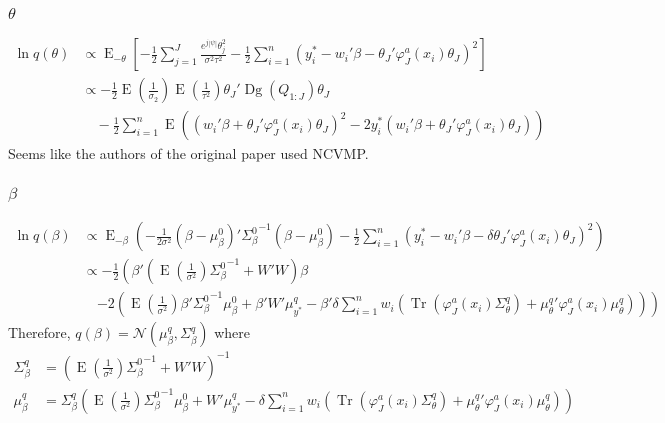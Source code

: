 \documentclass[11pt]{article}
\DeclareMathOperator{\Tr}{Tr}
\newcommand{\opn}{\operatorname}
\begin{document}
\subsubsection{$\theta$}
  \begin{align*}
    \ln q\left(\theta\right) &\propto \opn{E}_{-\theta}\left[-\frac{1}{2}\sum_{j=1}^{J}\frac{e^{j\left|\psi\right|}\theta_{j}^{2}}{\sigma^{2}\tau^{2}} -\frac{1}{2}\sum_{i=1}^{n}\left(y_{i}^{*}-w_{i}'\beta -\theta_{J}'\varphi_{J}^{a}\left(x_{i}\right)\theta_{J}\right)^{2} \right]\\
    &\propto -\frac{1}{2}\opn{E}\left(\frac{1}{\sigma_{2}}\right)\opn{E}\left(\frac{1}{\tau^{2}}\right)\theta_{J}'\opn{Dg}\left(Q_{1:J}\right)\theta_{J}\\
    &\quad  -\frac{1}{2}\sum_{i=1}^{n}\opn{E}\left(\left(w_{i}'\beta + \theta_{J}'\varphi_{J}^{a}\left(x_{i}\right)\theta_{J} \right)^{2} -2y_{i}^{*}\left(w_{i}'\beta + \theta_{J}'\varphi_{J}^{a}\left(x_{i}\right)\theta_{J}\right) \right)
  \end{align*}
Seems like the authors of the original paper used NCVMP.
\subsubsection{$\beta$}
  \begin{align*}
    \ln q\left(\beta\right)&\propto \opn{E}_{-\beta}\left(-\frac{1}{2\sigma^{2}}\left(\beta-\mu_{\beta}^{0}\right)'{\Sigma_{\beta}^{0}}^{-1}\left(\beta-\mu_{\beta}^{0}\right)-\frac{1}{2}\sum_{i=1}^{n}\left(y_{i}^{*}-w_{i}'\beta -\delta\theta_{J}'\varphi_{J}^{a}\left(x_{i}\right)\theta_{J}\right)^{2} \right)\\
    &\propto -\frac{1}{2}\left(\beta'\left(\opn{E}\left(\frac{1}{\sigma^{2}}\right){\Sigma_{\beta}^{0}}^{-1} + W'W\right)\beta \right.\\
    &\quad  \left. -2\left(\opn{E}\left(\frac{1}{\sigma^{2}}\right)\beta'{\Sigma_{\beta}^{0}}^{-1}\mu_{\beta}^{0} +\beta'W'\mu_{y^{*}}^{q}-\beta'\delta\sum_{i=1}^{n}w_{i}\left(\Tr\left(\varphi_{J}^{a}\left(x_{i}\right)\Sigma_{\theta}^{q}\right)+{\mu_{\theta}^{q}}'\varphi_{J}^{a}\left(x_{i}\right)\mu_{\theta}^{q}\right)\right)\right)
  \end{align*}
Therefore, $q\left(\beta\right) = \mathcal{N}\left(\mu_{\beta}^{q}, \Sigma_{\beta}^{q}\right)$ where
\begin{align*}
  \Sigma_{\beta}^{q} &= \left(\opn{E}\left(\frac{1}{\sigma^{2}}\right){\Sigma_{\beta}^{0}}^{-1} + W'W\right)^{-1}\\
  \mu_{\beta}^{q} &= \Sigma_{\beta}^{q}\left(\opn{E}\left(\frac{1}{\sigma^{2}}\right) {\Sigma_{\beta}^{0}}^{-1}\mu_{\beta}^{0} +W'\mu_{y^{*}}^{q} -\delta\sum_{i=1}^{n}w_{i}\left(\Tr\left(\varphi_{J}^{a}\left(x_{i}\right)\Sigma_{\theta}^{q}\right) + {\mu_{\theta}^{q}}'\varphi_{J}^{a}\left(x_{i}\right)\mu_{\theta}^{q}\right)\right)
\end{align*}
\end{document}
